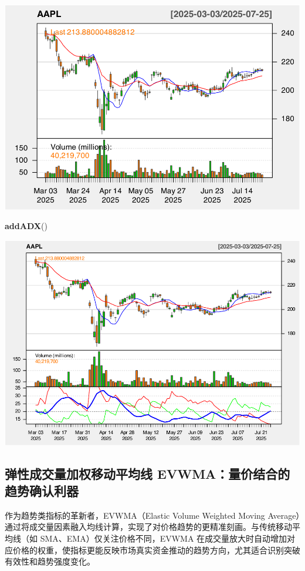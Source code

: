 \documentclass[]{ctexbook}
\newenvironment{Shaded}{\begin{snugshade}}{\end{snugshade}}
\newcommand{\FunctionTok}[1]{\textcolor[rgb]{0.13,0.29,0.53}{\textbf{#1}}}
\newcommand{\NormalTok}[1]{#1}
\begin{document}
\includegraphics[width=0.9\linewidth]{QuantmodHandbook_files/figure-latex/zlema_2-3}

\begin{Shaded}
\begin{Highlighting}[]
\FunctionTok{addADX}\NormalTok{()}
\end{Highlighting}
\end{Shaded}

\includegraphics[width=0.9\linewidth]{QuantmodHandbook_files/figure-latex/zlema_2-4}

\subsection{弹性成交量加权移动平均线 EVWMA：量价结合的趋势确认利器}\label{ux5f39ux6027ux6210ux4ea4ux91cfux52a0ux6743ux79fbux52a8ux5e73ux5747ux7ebf-evwmaux91cfux4ef7ux7ed3ux5408ux7684ux8d8bux52bfux786eux8ba4ux5229ux5668}

作为趋势类指标的革新者，EVWMA（Elastic Volume Weighted Moving Average）通过将成交量因素融入均线计算，实现了对价格趋势的更精准刻画。与传统移动平均线（如 SMA、EMA）仅关注价格不同，EVWMA 在成交量放大时自动增加对应价格的权重，使指标更能反映市场真实资金推动的趋势方向，尤其适合识别突破有效性和趋势强度变化。
\end{document}
